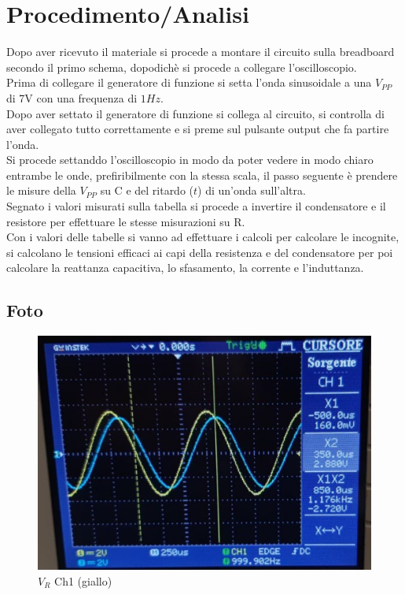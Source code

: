 \documentclass[12pt]{article}
\begin{document}
\section{Procedimento/Analisi}
    Dopo aver ricevuto il materiale si procede a montare il circuito sulla breadboard secondo il primo schema, dopodichè si procede a collegare l'oscilloscopio.\\
    Prima di collegare il generatore di funzione si setta l'onda sinusoidale a una $V_{PP}$ di 7V con una frequenza di $1Hz$.\\
    Dopo aver settato il generatore di funzione si collega al circuito, si controlla di aver collegato tutto correttamente e si preme sul pulsante output che 
    fa partire l'onda.\\
    Si procede settanddo l'oscilloscopio in modo da poter vedere in modo chiaro entrambe le onde, prefiribilmente con la stessa scala, il passo seguente 
    è prendere le misure della  $V_{PP}$ su C e del ritardo ($t$) di un'onda sull'altra.\\
    Segnato i valori misurati sulla tabella si procede a invertire il condensatore e il resistore per effettuare le stesse misurazioni su R.\\
    Con i valori delle tabelle si vanno ad effettuare i calcoli per calcolare le incognite, si calcolano le tensioni efficaci ai capi della resistenza e del condensatore
    per poi calcolare la reattanza capacitiva, lo sfasamento, la corrente e l'induttanza.\\ 
    \subsection{Foto}
    \begin{figure}[!h]
        \centering
        \includegraphics[scale=0.2]{images/photo_2021-10-06_16-31-10.jpg}
        \caption{$V_R$ Ch1 (giallo)}
    \end{figure}
    
\end{document}
